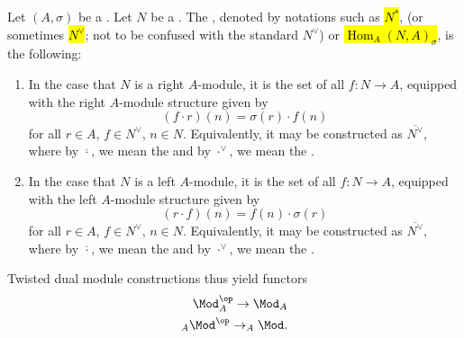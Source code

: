 \begin{definition} \label{definition:twisted_dual_module_of_a_module_over_a_ring_with_involution}
Let $(A, \sigma)$ be a . Let $N$ be a .
The , denoted by notations such as \hl{$N^*$}, (or sometimes \hl{$N^\vee$}; not to be confused with the standard  $N^\vee$) or \hl{$\operatorname{Hom}_A(N, A)_\sigma$}, is the following:
\begin{enumerate}
    \item In the case that $N$ is a right $A$-module, it is the set of all  $f: N \to A$, equipped with the right $A$-module structure given by
    $$ (f \cdot r)(n) = \sigma(r) \cdot f(n) $$
    for all $r \in A$, $f \in N^\vee$, $n \in N$.
    Equivalently, it may be constructed as $\overline{N^\vee}$, where by $\overline{\cdot}$, we mean the  and by ${\cdot}^\vee$, we mean the . 

    \item In the case that $N$ is a left $A$-module, it is the set of all 
     $f: N \to A$, equipped with the left $A$-module structure given by
    $$ (r \cdot f)(n) = f(n) \cdot \sigma(r)$$
    for all $r \in A$, $f \in N^\vee$, $n \in N$.
    Equivalently, it may be constructed as $\overline{N^\vee}$, where by $\overline{\cdot}$, we mean the  and by ${\cdot}^\vee$, we mean the . 

\end{enumerate}


Twisted dual module constructions thus yield functors
\begin{align*}
    \Mod_A^{\op} \to \Mod_A \\
    _{A} \Mod^{\op} \to _{A} \Mod.\\
\end{align*}


\end{definition}
